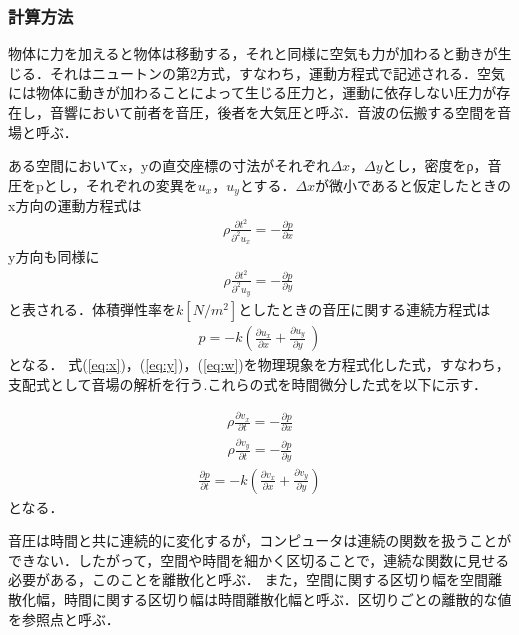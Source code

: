 \documentclass[a4j,12pt]{jsarticle}
\begin{document}
\subsubsection{計算方法}
物体に力を加えると物体は移動する，それと同様に空気も力が加わると動きが生じる．それはニュートンの第2方式，すなわち，運動方程式で記述される．空気には物体に動きが加わることによって生じる圧力と，運動に依存しない圧力が存在し，音響において前者を音圧，後者を大気圧と呼ぶ．音波の伝搬する空間を音場と呼ぶ．

ある空間においてx，yの直交座標の寸法がそれぞれ$\Delta x$，$\Delta y$とし，密度をρ，音圧をpとし，それぞれの変異を$u_x$，$u_y$とする．$\Delta x$が微小であると仮定したときのx方向の運動方程式は
\begin {eqnarray}
\label{eq:x}
\rho \frac {\partial t^2} {  \partial ^2 u_x } = - \frac { \partial p } { \partial x } \
\end{eqnarray}
y方向も同様に
\begin {eqnarray}
\label{eq:y}
\rho \frac {\partial t^2} {  \partial ^2 u_y } = - \frac { \partial p } { \partial y } \
\end{eqnarray}
と表される．体積弾性率を$k[N/m^2]$としたときの音圧に関する連続方程式は
\begin {eqnarray}
\label{eq:w}
p = -k ( \frac { \partial u _ x } { \partial x } + \frac { \partial u_y } { \partial y } \ )
\end{eqnarray}
となる．
式(\ref{eq:x})，(\ref{eq:y})，(\ref{eq:w})を物理現象を方程式化した式，すなわち，支配式として音場の解析を行う.これらの式を時間微分した式を以下に示す．

\begin {eqnarray}
\label{eq :  x-2}
\rho \frac{ \partial v_x } { \partial t } = - \frac { \partial p }{ \partial x }
\end{eqnarray}
\begin {eqnarray}
\label{eq :y-2}
\rho \frac{ \partial v_y } { \partial t } = - \frac { \partial p }{ \partial y }
\end{eqnarray}
\begin {eqnarray}
\label{eq :  w-2}
\frac{ \partial p } { \partial t } = - k ( \frac { \partial v_x }{ \partial x } + \frac { \partial v_y }{ \partial y } ) 
\end{eqnarray}
となる．

音圧は時間と共に連続的に変化するが，コンピュータは連続の関数を扱うことができない．したがって，空間や時間を細かく区切ることで，連続な関数に見せる必要がある，このことを離散化と呼ぶ．
また，空間に関する区切り幅を空間離散化幅，時間に関する区切り幅は時間離散化幅と呼ぶ．区切りごとの離散的な値を参照点と呼ぶ．
\end{document}
